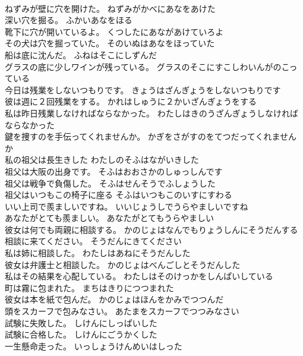 \documentclass[8pt]{extreport}
\begin{document}
\begin{CJK}{UTF8}{min}
\\	ねずみが壁に穴を開けた。	ねずみがかべにあなをあけた 
\\	深い穴を掘る。	ふかいあなをほる 
\\	靴下に穴が開いているよ。	くつしたにあながあけていろよ 
\\	その犬は穴を掘っていた。	そのいぬはあなをほっていた 
\\	船は底に沈んだ。	ふねはそこにしずんだ 
\\	グラスの底に少しワインが残っている。	グラスのそこにすこしわいんがのこっている 
\\	今日は残業をしないつもりです。	きょうはざんぎょうをしないつもりです 
\\	彼は週に２回残業をする。	かれはしゅうに２かいざんぎょうをする 
\\	私は昨日残業しなければならなかった。	わたしはきのうざんぎょうしなければならなかった 
\\	鍵を捜すのを手伝ってくれませんか。	かぎをさがすのをてつだってくれませんか 
\\	私の祖父は長生きした	わたしのそふはながいきした 
\\	祖父は大阪の出身です。	そふはおおさかのしゅっしんです 
\\	祖父は戦争で負傷した。	そふはせんそうでふしょうした 
\\	祖父はいつもこの椅子に座る	そふはいつもこのいすにすわる 
\\	いい上司で羨ましいですね。	いいじょうしでうらやましいですね 
\\	あなたがとても羨ましい。	あなたがとてもうらやましい 
\\	彼女は何でも両親に相談する。	かのじょはなんでもりょうしんにそうだんする 
\\	相談に来てください。	そうだんにきてください 
\\	私は姉に相談した。	わたしはあねにそうだんした 
\\	彼女は弁護士と相談した。	かのじょはべんごしとそうだんした 
\\	私はその結果を心配している。	わたしはそのけっかをしんぱいしている 
\\	町は霧に包まれた。	まちはきりにつつまれた 
\\	彼女は本を紙で包んだ。	かのじょはほんをかみでつつんだ 
\\	頭をスカーフで包みなさい。	あたまをスカーフでつつみなさい 
\\	試験に失敗した。	しけんにしっぱいした 
\\	試験に合格した。	しけんにごうかくした 
\\	一生懸命走った。	いっしょうけんめいはしった 

\end{CJK}
\end{document}
